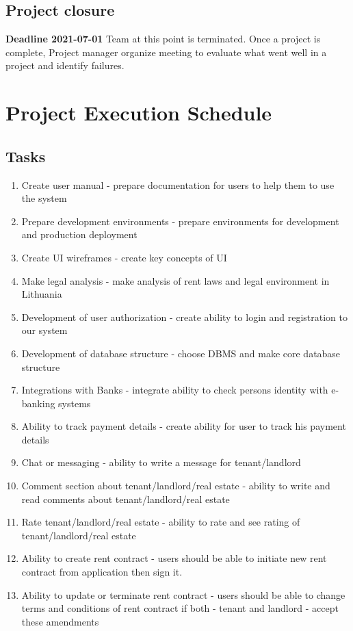\documentclass{VUMIFPSkursinis}
\begin{document}
	\subsection{Project closure}
	\textbf{Deadline 2021-07-01}
	Team at this point is terminated. Once a project is complete, Project manager organize meeting to evaluate what went well in a project and identify failures.

\section{Project Execution Schedule}

	\subsection{Tasks}
	\begin{enumerate}
		\item{Create user manual} - prepare documentation for users to help them to use the system
		\item{Prepare development environments} - prepare environments for development and production deployment
		\item{Create UI wireframes} - create key concepts of UI
		\item{Make legal analysis} - make analysis of rent laws and legal environment in Lithuania
		\item{Development of user authorization} - create ability to login and registration to our system
		\item{Development of database structure} - choose DBMS and make core database structure
		\item{Integrations with Banks} - integrate ability to check persons identity with e-banking systems
		\item{Ability to track payment details} - create ability for user to track his payment details
		\item{Chat or messaging} - ability to write a message for tenant/landlord
		\item{Comment section about tenant/landlord/real estate} - ability to write and read comments about tenant/landlord/real estate
		\item{Rate tenant/landlord/real estate} - ability to rate and see rating of tenant/landlord/real estate
		\item{Ability to create rent contract} - users should be able to initiate new rent contract from application then sign it.
		\item{Ability to update or terminate rent contract} - users should be able to change terms and conditions of rent contract if both - tenant and landlord - accept these amendments

\end{enumerate}
\end{document}
